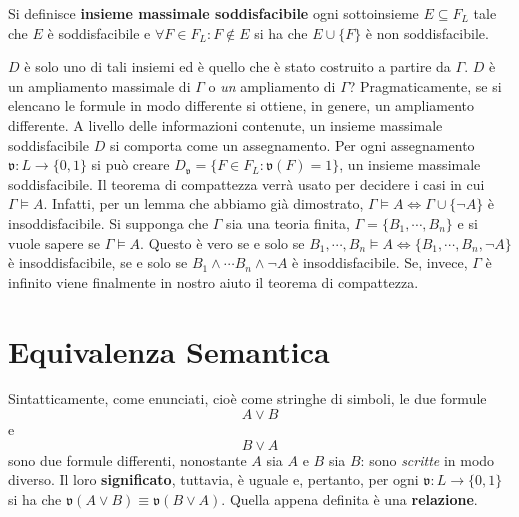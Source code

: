 \begin{defi}
  Si definisce \textbf{insieme massimale soddisfacibile} 
  ogni sottoinsieme $E \subseteq F_L$ tale che 
$E$ è soddisfacibile e $\forall F \in F_L : F\notin E$ si ha che $E \cup \{F\}$ è 
non soddisfacibile. 
\end{defi}
$D$ è solo uno di tali insiemi ed è quello che è stato 
costruito a partire da $\Gamma$. $D$ è un ampliamento massimale di $\Gamma$ o 
\textit{un} ampliamento di $\Gamma$? 
Pragmaticamente, se si elencano le formule in modo differente si ottiene, in genere, 
un ampliamento differente.
A livello delle informazioni contenute, un insieme massimale soddisfacibile $D$ 
si comporta come un assegnamento. Per ogni assegnamento $\mathfrak{v} : L \rightarrow \{0,1\}$ 
si può creare $D_\mathfrak{v} = \{ F \in F_L : \mathfrak{v}(F) = 1\}$, un 
insieme massimale soddisfacibile. 
Il teorema di compattezza verrà usato per decidere i casi in cui $\Gamma \models A$. 
Infatti, per un lemma che abbiamo già dimostrato, $\Gamma \models A \iff \Gamma \cup \{\neg A \} $
è insoddisfacibile. Si supponga che $\Gamma$ sia una teoria finita, 
$\Gamma = \{B_1, \cdots, B_n\}$ e si vuole sapere se $\Gamma \models A$. 
Questo è vero se e solo se $B_1, \cdots, B_n \models A \iff \{B_1, \cdots,B_n,\neg A\}$ è 
insoddisfacibile, se e solo se $B_1 \land \cdots B_n \land \neg A$ è 
insoddisfacibile. Se, invece, $\Gamma$ è infinito viene finalmente in 
nostro aiuto il teorema di compattezza. 

\section{Equivalenza Semantica}
Sintatticamente, come enunciati, cioè come stringhe di simboli, le 
due formule 
$$
A \lor B
$$ 
e 
$$
B \lor A 
$$ 
sono due formule differenti, nonostante $A$ sia $A$ e $B$ 
sia $B$: sono \textit{scritte} in modo diverso. Il loro \textbf{significato}, 
tuttavia, è uguale e, pertanto, per ogni $\mathfrak{v} : L \rightarrow \{0,1\}$ si ha che 
$\mathfrak{v}(A \lor B) \equiv \mathfrak{v}(B \lor A)$. Quella appena 
definita è una \textbf{relazione}. 

